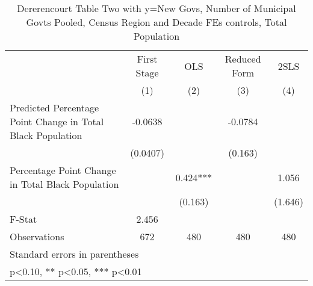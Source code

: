 \begin{table}[htbp]\centering
\def\sym#1{\ifmmode^{#1}\else\(^{#1}\)\fi}
\caption{Dererencourt Table Two with y=New Govs, Number of Municipal Govts  Pooled, Census Region and Decade FEs controls, Total Population}
\begin{tabular}{l*{4}{c}}
\toprule
                    & First Stage   &         OLS   &Reduced Form   &        2SLS   \\
                    &\multicolumn{1}{c}{(1)}   &\multicolumn{1}{c}{(2)}   &\multicolumn{1}{c}{(3)}   &\multicolumn{1}{c}{(4)}   \\
\midrule
Predicted Percentage Point Change in Total Black Population&     -0.0638   &               &     -0.0784   &               \\
                    &    (0.0407)   &               &     (0.163)   &               \\
\addlinespace
Percentage Point Change in Total Black Population&               &       0.424***&               &       1.056   \\
                    &               &     (0.163)   &               &     (1.646)   \\
\midrule
F-Stat              &       2.456   &               &               &               \\
Observations        &         672   &         480   &         480   &         480   \\
\bottomrule
\multicolumn{5}{l}{\footnotesize Standard errors in parentheses}\\
\multicolumn{5}{l}{\footnotesize * p<0.10, ** p<0.05, *** p<0.01}\\
\end{tabular}
\end{table}
